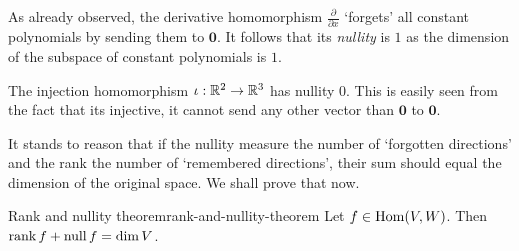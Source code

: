\begin{example}{}{}
 As already observed, the derivative homomorphism $\frac{\partial }{\partial x}$
 `forgets' all constant polynomials by sending them to $\mathbf{0}$. It follows
 that its \emph{nullity} is $1$ as the dimension of the subspace of constant
 polynomials is $1$.
\end{example}
\begin{example}{}{}
 The injection homomorphism $\iota:\mathbb{R}^2 \to \mathbb{R}^3$ has nullity $0$. This is
 easily seen from the fact that its injective, it cannot send any other vector
 than $\mathbf{0}$ to $\mathbf{0}$.
\end{example}
It stands to reason that if the nullity measure the number of `forgotten
directions' and the rank the number of `remembered directions', their sum should
equal the dimension of the original space. We shall prove that now.
\begin{proposition}{Rank and nullity theorem}{rank-and-nullity-theorem}
 Let $f \in \operatorname{Hom}(V,W)$. Then $\operatorname{rank} f + \operatorname{null} f = \dim V$.
\end{proposition}
